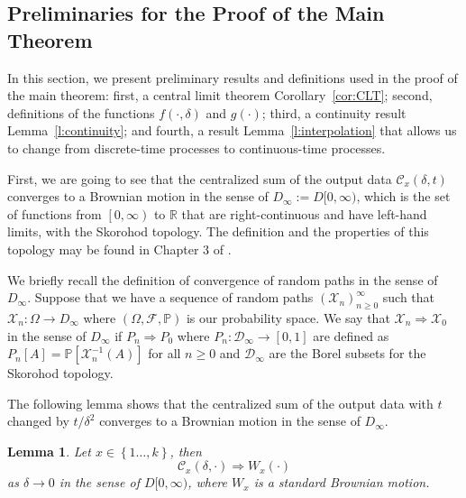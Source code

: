 \documentclass{wscpaperproc}
\theoremstyle{wsc}
\newtheorem{lemma}{Lemma}
\begin{document}
\subsection{Preliminaries for the Proof of the Main Theorem}

In this section, we present preliminary results and definitions used in the proof of the main theorem: first, a central limit theorem Corollary~\ref{cor:CLT}; second, definitions of the functions $f(\cdot,\delta)$ and $g(\cdot)$; third, a continuity result Lemma~\ref{l:continuity}; and fourth, a result Lemma~\ref{l:interpolation} that allows us to change from discrete-time processes to continuous-time processes.

First, we are going to see that the centralized sum of the output
data $\mathcal{C}_x(\delta,t)$ converges to a Brownian motion in the sense of $D_{\infty}:=D[0,\infty)$,
which is the set of functions from $\left[0,\infty\right)$ to $\mathbb{R}$
that are right-continuous and have left-hand limits, with the Skorohod
topology. The definition and the properties of this topology may be
found in Chapter 3 of . 

We briefly recall the definition of convergence of random paths in
the sense of $D_{\infty}$. Suppose that we have a sequence of random
paths $\left(\mathcal{X}_{n}\right)_{n\geq0}^{\infty}$ such that
$\mathcal{X}_{n}:\varOmega\rightarrow D_{\infty}$ where $\left(\Omega,\mathcal{F},\mathbb{P}\right)$
is our probability space. We say that $\mathcal{X}_{n}\Rightarrow\mathcal{X}_{0}$
in the sense of $D_{\infty}$ if $P_{n}\Rightarrow P_{0}$ where $P_{n}:\mathcal{D}_{\infty}\rightarrow\left[0,1\right]$
are defined as $P_{n}\left[A\right]=\mathbb{P}\left[\mathcal{X}_{n}^{-1}\left(A\right)\right]$
for all $n\geq0$ and $\mathcal{D}_{\infty}$ are the Borel subsets
for the Skorohod topology.

The following lemma shows that the centralized sum of the output
data with $t$ changed by $t/\delta^{2}$ converges to a Brownian
motion in the sense of $D_{\infty}$. 

\begin{lemma}
Let $x\in\left\{ 1\ldots,k\right\} $, then
\[
\mathcal{C}_{x}\left(\delta,\cdot\right)\Rightarrow W_{x}\left(\cdot\right)
\]
as $\delta\rightarrow0$ in the sense of $D[0,\infty)$, where $W_{x}$
is a standard Brownian motion.
\end{lemma}
\end{document}
